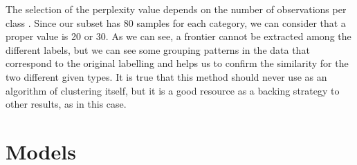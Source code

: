 	The selection of the perplexity value depends on the number of observations per class \cite{Wattenberg2016}. Since our subset has 80 samples for each category, we can consider that a proper value is 20 or 30. As we can see, a frontier cannot be extracted among the different labels, but we can see some grouping patterns in the data that correspond to the original labelling and helps us to confirm the similarity for the two different given types. It is true that this method should never use as an algorithm of clustering itself, but it is a good resource as a backing strategy to other results, as in this case. 
	
\section{Models}

	
	
	


	
	
	
	
	

	
	
	

	
	
	
	
	
	
	
	
	